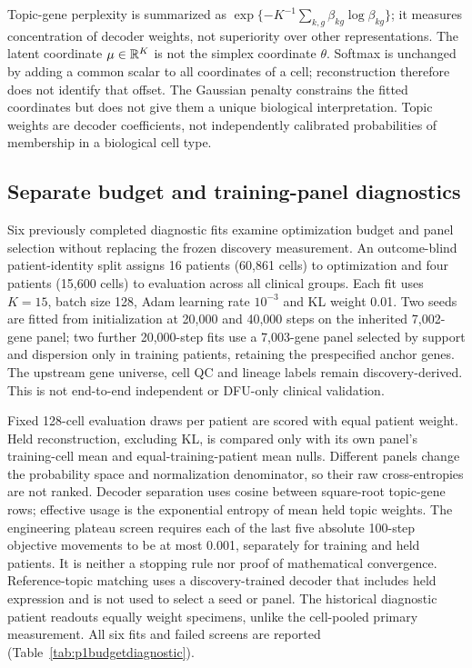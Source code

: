 Topic-gene perplexity is summarized as $\exp\{-K^{-1}\sum_{k,g}\beta_{kg}\log\beta_{kg}\}$; it measures concentration of decoder weights, not superiority over other representations. The latent coordinate $\mu\in\mathbb{R}^K$ is not the simplex coordinate $\theta$. Softmax is unchanged by adding a common scalar to all coordinates of a cell; reconstruction therefore does not identify that offset. The Gaussian penalty constrains the fitted coordinates but does not give them a unique biological interpretation. Topic weights are decoder coefficients, not independently calibrated probabilities of membership in a biological cell type.

\subsection{Separate budget and training-panel diagnostics}
Six previously completed diagnostic fits examine optimization budget and panel selection without replacing the frozen discovery measurement. An outcome-blind patient-identity split assigns 16 patients (60,861 cells) to optimization and four patients (15,600 cells) to evaluation across all clinical groups. Each fit uses $K=15$, batch size 128, Adam learning rate $10^{-3}$ and KL weight 0.01. Two seeds are fitted from initialization at 20,000 and 40,000 steps on the inherited 7,002-gene panel; two further 20,000-step fits use a 7,003-gene panel selected by support and dispersion only in training patients, retaining the prespecified anchor genes. The upstream gene universe, cell QC and lineage labels remain discovery-derived. This is not end-to-end independent or DFU-only clinical validation.

Fixed 128-cell evaluation draws per patient are scored with equal patient weight. Held reconstruction, excluding KL, is compared only with its own panel's training-cell mean and equal-training-patient mean nulls. Different panels change the probability space and normalization denominator, so their raw cross-entropies are not ranked. Decoder separation uses cosine between square-root topic-gene rows; effective usage is the exponential entropy of mean held topic weights. The engineering plateau screen requires each of the last five absolute 100-step objective movements to be at most 0.001, separately for training and held patients. It is neither a stopping rule nor proof of mathematical convergence. Reference-topic matching uses a discovery-trained decoder that includes held expression and is not used to select a seed or panel. The historical diagnostic patient readouts equally weight specimens, unlike the cell-pooled primary measurement. All six fits and failed screens are reported (Table~\ref{tab:p1budgetdiagnostic}).


